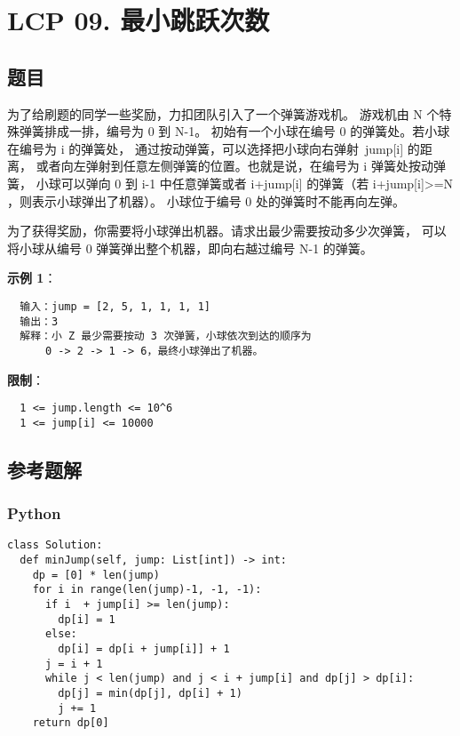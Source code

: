 \newpage
\section{LCP 09. 最小跳跃次数}
\label{leetcode:lcp_09}

\subsection{题目}

为了给刷题的同学一些奖励，力扣团队引入了一个弹簧游戏机。
游戏机由 N 个特殊弹簧排成一排，编号为 0 到 N-1。
初始有一个小球在编号 0 的弹簧处。若小球在编号为 i 的弹簧处，
通过按动弹簧，可以选择把小球向右弹射 jump[i] 的距离，
或者向左弹射到任意左侧弹簧的位置。也就是说，在编号为 i 弹簧处按动弹簧，
小球可以弹向 0 到 i-1 中任意弹簧或者 i+jump[i] 的弹簧（若 i+jump[i]>=N ，则表示小球弹出了机器）。
小球位于编号 0 处的弹簧时不能再向左弹。

为了获得奖励，你需要将小球弹出机器。请求出最少需要按动多少次弹簧，
可以将小球从编号 0 弹簧弹出整个机器，即向右越过编号 N-1 的弹簧。

\textbf{示例 1}：

\begin{verbatim}
  输入：jump = [2, 5, 1, 1, 1, 1]
  输出：3
  解释：小 Z 最少需要按动 3 次弹簧，小球依次到达的顺序为
      0 -> 2 -> 1 -> 6，最终小球弹出了机器。
\end{verbatim}

\textbf{限制}：

\begin{verbatim}
  1 <= jump.length <= 10^6
  1 <= jump[i] <= 10000
\end{verbatim}

\subsection{参考题解}

\subsubsection{Python}

\begin{verbatim}
class Solution:
  def minJump(self, jump: List[int]) -> int:
    dp = [0] * len(jump)
    for i in range(len(jump)-1, -1, -1):
      if i  + jump[i] >= len(jump):
        dp[i] = 1
      else:
        dp[i] = dp[i + jump[i]] + 1
      j = i + 1
      while j < len(jump) and j < i + jump[i] and dp[j] > dp[i]:
        dp[j] = min(dp[j], dp[i] + 1)
        j += 1
    return dp[0]
\end{verbatim}
